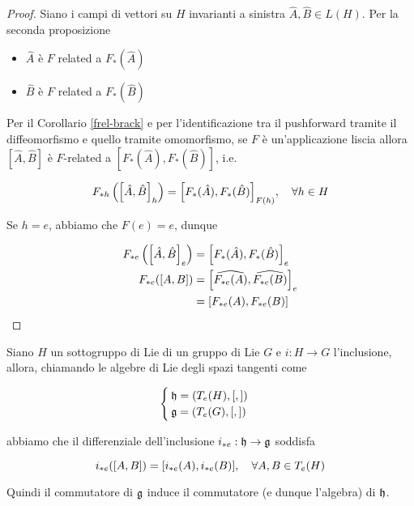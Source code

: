 \begin{proof}
	Siano i campi di vettori su $ H $ invarianti a sinistra $ \hat{A},\hat{B} \in L(H) $. Per la seconda proposizione
	
	\begin{itemize}
		\item $ \hat{A} $ è $ F $ related a $ F_{*}(\hat{A}) $
		
		\item $ \hat{B} $ è $ F $ related a $ F_{*}(\hat{B}) $
	\end{itemize}

	Per il Corollario \ref{frel-brack} e per l'identificazione tra il pushforward tramite il diffeomorfismo e quello tramite omomorfismo, se $ F $ è un'applicazione liscia allora $ [\hat{A},\hat{B}] $ è $ F $-related a $ [F_{*} (\hat{A}),F_{*} (\hat{B})] $, i.e.
	
	\begin{equation}
		F_{*h} \left( \comm{\hat{A}}{\hat{B}}_{h} \right) = \comm{ F_{*}(\hat{A}) }{ F_{*}(\hat{B}) }_{F(h)} \qcomma \forall h \in H
	\end{equation}

	Se $ h=e $, abbiamo che $ F(e)=e $, dunque
	
	\begin{align}
		\begin{split}
			F_{*e} \left( \comm{\hat{A}}{\hat{B}}_{e} \right) &= \comm{ F_{*}(\hat{A}) }{ F_{*}(\hat{B}) }_{e}\\
			F_{*e} (\comm{A}{B}) &= \comm{ \widehat{ F_{*e}(A) } }{ \widehat{ F_{*e}(B) } }_{e}\\
			&= \comm{F_{*e} (A)}{F_{*e} (B)}
		\end{split}
	\end{align}
\end{proof}

\begin{corollary}
	Siano $ H $ un sottogruppo di Lie di un gruppo di Lie $ G $ e $ i : H \to G $ l'inclusione, allora, chiamando le algebre di Lie degli spazi tangenti come
	
	\begin{equation}
		\begin{cases}
			\mathfrak{h} = (T_{e}(H),[,])\\
			\mathfrak{g} = (T_{e}(G),[,])
		\end{cases}
	\end{equation}
	
	abbiamo che il differenziale dell'inclusione $ i_{*e} : \mathfrak{h} \to \mathfrak{g} $ soddisfa
	
	\begin{equation}
		i_{*e} (\comm{A}{B}) = \comm{i_{*e} (A)}{i_{*e} (B)} \qcomma \forall A,B \in T_{e}(H)
	\end{equation}

	Quindi il commutatore di $ \mathfrak{g} $ induce il commutatore (e dunque l'algebra) di $ \mathfrak{h} $.
\end{corollary}

